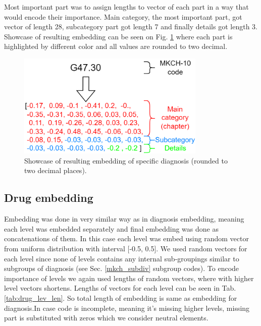 Most important part was to assign lengths to vector of each part in a way that would encode their importance. 
Main category, the most important part, got vector of length 28, subcategory part got length 7 and finally details got length 3.
\\

Showcase of resulting embedding can be seen on Fig. \ref{fig:diag_emb_show} where each part is highlighted by different color and all values are rounded to two decimal.

\begin{figure}[!h]
	\centering
	
	\includegraphics[width=0.8\textwidth]{images/diagnosis_embed_showcase.png} 
	
	\caption{Showcase of resulting embedding of specific diagnosis (rounded to two decimal places).}
	\label{fig:diag_emb_show}
\end{figure} 


\subsection{Drug embedding}

Embedding was done in very similar way as in diagnosis embedding, meaning each level was embedded separately and final embedding was done as concatenations of them. In this case each level was embed using random vector from uniform distribution with interval [-0.5, 0.5]. We used random vectors for each level since none of levels contains any internal sub-groupings similar to subgroups of diagnosis (see Sec. \ref{mkch_subdiv} subgroup codes). To encode importance of levels we again used lengths of random vectors, where with higher level vectors shortens. Lengths of vectors for each level can be seen in Tab. \ref{tab:drug_lev_len}. So total length of embedding is same as embedding for diagnosis.In case code is incomplete, meaning it's missing higher levels, missing part is substituted with zeros which we consider neutral elements.
\\


